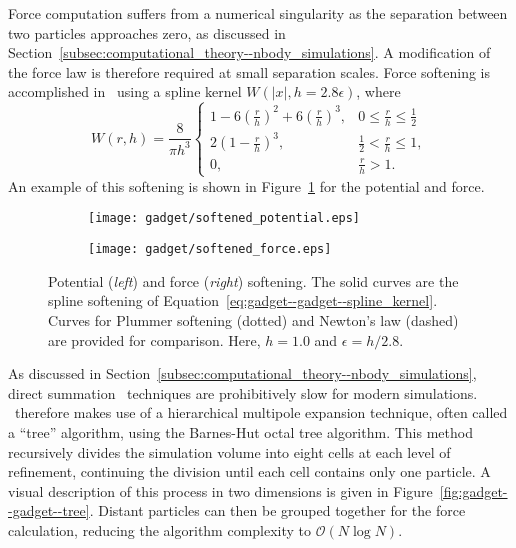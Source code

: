 Force computation suffers from a numerical singularity as the separation between two particles approaches zero, as discussed in Section~\ref{subsec:computational_theory--nbody_simulations}.  A modification of the force law is therefore required at small separation scales.  Force softening is accomplished in \gadgettwo\ using a spline kernel \citep{1985A&A...149..135M} $W(|x|, h = 2.8 \epsilon)$, where
\begin{equation} \label{eq:gadget--gadget--spline_kernel}
	W(r,h) = \frac{8}{\pi h^{3}}
	\begin{cases}
		1 - 6 \left( \frac{r}{h} \right)^{2} + 6 \left( \frac{r}{h} \right)^{3}, & 0 \leq \frac{r}{h} \leq \frac{1}{2} \\
		2 \left( 1 - \frac{r}{h} \right)^{3},                                    & \frac{1}{2} < \frac{r}{h} \leq 1, \\
		0,                                                                       & \frac{r}{h} > 1.
	\end{cases}
\end{equation}
An example of this softening is shown in Figure~\ref{fig:gadget--gadget--softening} for the potential and force.

\begin{figure}[t]
	\centering
	\begin{subfigure}{}
		\texttt{[image: gadget/softened\_potential.eps]}
	\end{subfigure}
	\begin{subfigure}{}
		\texttt{[image: gadget/softened\_force.eps]}
	\end{subfigure}
	\caption[Potential and force softening.]{\footnotesize Potential (\emph{left}) and force (\emph{right}) softening.  The solid curves are the spline softening of Equation~\ref{eq:gadget--gadget--spline_kernel}.  Curves for Plummer softening (dotted) and Newton's law (dashed) are provided for comparison.  Here, $h = 1.0$ and $\epsilon = h/2.8$.  \citep{2001NewA....6...79S}}
	\label{fig:gadget--gadget--softening}
\end{figure}

As discussed in Section~\ref{subsec:computational_theory--nbody_simulations}, direct summation \nbody\ techniques are prohibitively slow for modern simulations.  \gadgettwo\ therefore makes use of a hierarchical multipole expansion technique, often called a ``tree'' algorithm, using the Barnes-Hut octal tree \citep{1986Natur.324..446B} algorithm.  This method recursively divides the simulation volume into eight cells at each level of refinement, continuing the division until each cell contains only one particle.  A visual description of this process in two dimensions is given in Figure~\ref{fig:gadget--gadget--tree}.  Distant particles can then be grouped together for the force calculation, reducing the algorithm complexity to $\mathcal{O} (N \log N)$.

